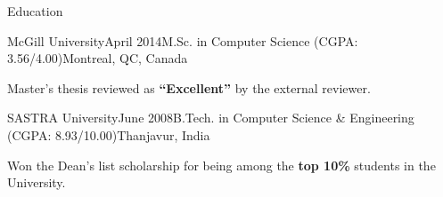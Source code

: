 \documentclass{resume} %
\begin{document}
 
\begin{rSection}{Education}

\begin{rSubsection}{McGill University}{April 2014}{M.Sc. in
Computer Science (CGPA: 3.56/4.00)}{Montreal, QC, Canada} 
\item Master's thesis reviewed as \textbf{``Excellent''} by the external
reviewer.
\end{rSubsection}

\begin{rSubsection}{SASTRA University}{June 2008}{B.Tech. in Computer Science
\& Engineering (CGPA: 8.93/10.00)}{Thanjavur, India} 
\item Won the {Dean's list scholarship} for being among the \textbf{top
10\%} students in the University. 
\end{rSubsection}

\end{rSection}
\end{document}
